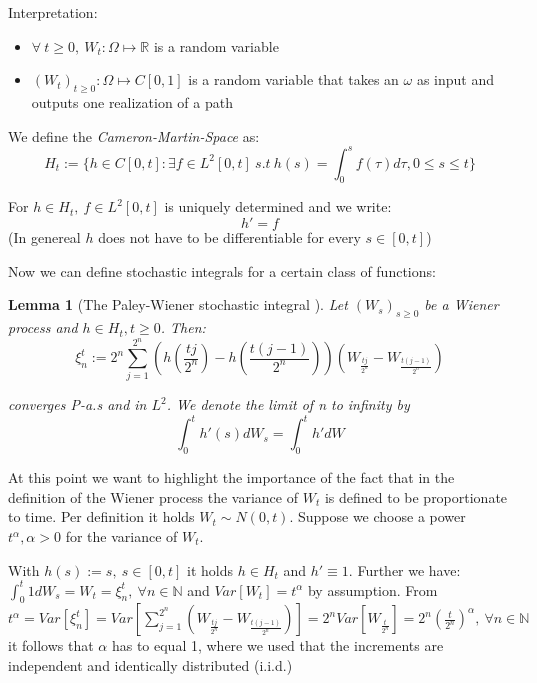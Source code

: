 \documentclass[%
thesis=student,%
coverpage=false,%
titlepage=false,%
headmarks=true, %
english,%
font=libertine, %
math=newpxtx, %
BCOR=5mm,%
coverBCOR=11mm%
]{tumbook}
\newtheorem{lemma}{Lemma}
\begin{document}
Interpretation: 

\begin{itemize}
    \item $\forall \ t \geq 0, \ W_{t}: \Omega \mapsto \mathbb{R}$ is a random variable 
    \item $(W_{t})_{t \geq 0} : \Omega \mapsto C[0,1]$ is a random variable that takes an $\omega$ as input and outputs one realization of a path
\end{itemize}

We define the \textit{Cameron-Martin-Space} as:
\[
H_{t} := \{ h \in C[0,t]: \exists f \in L^{2}[0,t] \ s.t \  h(s) = \int_{0}^{s} f(\tau) d\tau, 0 \leq s \leq t \}
\]

For $h \in H_{t},\ f \in L^{2}[0,t]$ is uniquely determined and we write: 
\[
h' = f
\]
(In genereal $h$ does not have to be differentiable for every $s \in [0,t]$)

Now we can define stochastic integrals for a certain class of functions:

\begin{lemma}[The Paley-Wiener stochastic integral \cite{gantert:2024}] 
Let $(W_{s})_{s\geq 0}$ be a Wiener process and $h \in H_{t}, t \geq 0$. Then:
\[
\xi_{n}^{t} := 2^{n}\sum_{j=1}^{2^{n}}(h(\frac{tj}{2^{n}})-h(\frac{t(j-1)}{2^{n}}))(W_{\frac{tj}{2^{n}}}-W_{\frac{t(j-1)}{2^{n}}}) 
\]

converges P-a.s and in $L^{2}$. We denote the limit of n to infinity by
\[
\int_{0}^{t}h'(s)dW_{s} = \int_{0}^{t}h'dW
\]
\end{lemma}

At this point we want to highlight the importance of the fact that in the definition of the Wiener process the variance of $W_{t}$ is defined to be proportionate to time. Per definition it holds $W_{t} \sim N(0,t)$. Suppose we choose a power $t^{\alpha}, \alpha > 0$ for the variance of $W_{t}$. 

With $h(s) := s, \ s \in [0,t]$ it holds $h \in H_{t}$ and $h' \equiv 1$. Further we have: $\int_{0}^{t} 1 dW_{s} = W_{t} = \xi_{n}^{t}, \ \forall n \in \mathbb{N}$ and $Var[W_{t}] = t^{\alpha}$ by assumption. From 
$t^{\alpha} = Var[\xi_{n}^{t}] = Var\left[\sum_{j=1}^{2^{n}}\left(W_{\frac{tj}{2^{n}}} - W_{\frac{t(j-1)}{2^{n}}}\right)\right] = 2^{n}Var\left[W_{\frac{t}{2^n}}\right] = 2^{n}\left(\frac{t}{2^{n}}\right)^{\alpha}, \ \forall n \in \mathbb{N}$ it follows that $\alpha$ has to equal 1, where we used that the increments are independent and identically distributed (i.i.d.)  \\
\end{document}
